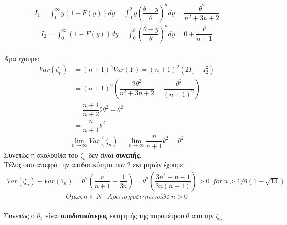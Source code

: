\documentclass{article}
\begin{document}
\begin{align*}
I_{1}=\int_{0}^{\infty}y(1-F(y))dy=\int_{0}^{\theta}y\left(\dfrac{\theta-y}{\theta}\right)^{n}dy=\dfrac{\theta^{2}}{n^{2}+3n+2}
\end{align*}
\begin{align*}
I_{2}=\int_{0}^{\infty}(1-F(y))dy=\int_{0}^{\theta}\left(\dfrac{\theta-y}{\theta}\right)^{n}dy=0+\dfrac{\theta}{n+1}
\end{align*}
\\
Άρα έχουμε: 
\begin{align*}
Var(\zeta_{n}) &=(n+1)^{2}Var(Y)=(n+1)^{2}(2I_{1}-I_{2}^{2}) \\
&=(n+1)^{2}\left(\dfrac{2\theta^{2}}{n^{2}+3n+2}-\dfrac{\theta^{2}}{(n+1)^{2}}\right) \\
&=\dfrac{n+1}{n+2}2\theta^{2}-\theta^{2}\\
&=\dfrac{n}{n+1}\theta^{2}
\end{align*}
\begin{align*}
\lim_{n \to \infty}Var(\zeta_{n})=\lim_{n \to \infty}\dfrac{n}{n+1}\theta^{2}=\theta^{2}
\end{align*}
Συνεπώς η ακολουθία του $\zeta_{n}$ δεν είναι \textbf{συνεπής}.
\\
Τέλος οσο αναφρά την αποδοτικότητα των 2 εκτιμητών έχουμε:
\\
\begin{align*}
Var(\zeta_{n})-Var(\theta_{n})=\theta^{2}\left(\dfrac{n}{n+1}- \dfrac{1}{3n}\right)=\theta^{2}\left(\dfrac{3n^{2}-n-1}{3n(n+1)}\right)>0 ~~for~n>1/6 (1 + \sqrt{13})
\end{align*}
\[ Ομως~ n \in N_{+} ~Αρα~ισχυει~για~κάθε~ n>0 \]
\\
Συνεπώς ο $\theta_{n}$ είναι \textbf{αποδοτικότερος} εκτιμητής της παραμέτρου $\theta$ απο την $\zeta_{n}$
\end{document}

